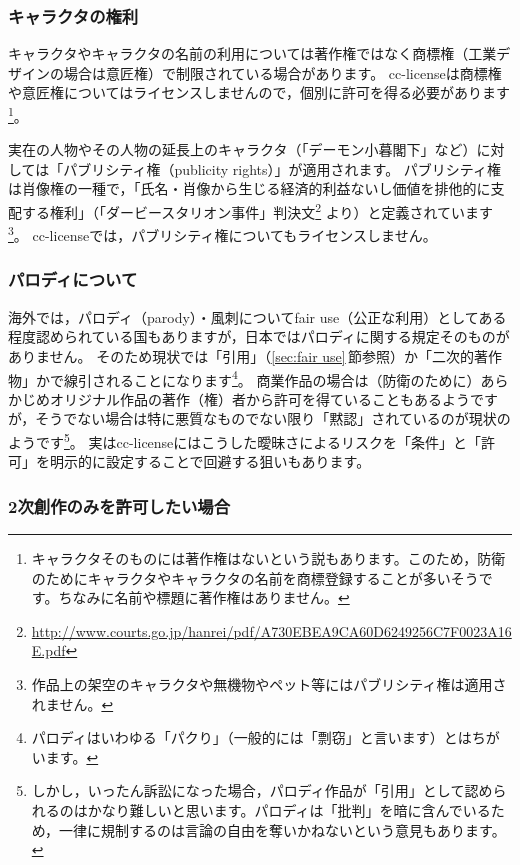 \documentclass{ltjsarticle}
\begin{document}
\subsubsection{キャラクタの権利}

キャラクタやキャラクタの名前の利用については著作権ではなく商標権（工業デザインの場合は意匠権）で制限されている場合があります。
cc-licenseは商標権や意匠権についてはライセンスしませんので，個別に許可を得る必要があります\footnote{キャラクタそのものには著作権はないという説もあります。このため，防衛のためにキャラクタやキャラクタの名前を商標登録することが多いそうです。ちなみに名前や標題に著作権はありません。}。

実在の人物やその人物の延長上のキャラクタ（「デーモン小暮閣下」など）に対しては「パブリシティ権（publicity rights）」が適用されます。
パブリシティ権は肖像権の一種で，「氏名・肖像から生じる経済的利益ないし価値を排他的に支配する権利」（「ダービースタリオン事件」判決文\footnote{\url{http://www.courts.go.jp/hanrei/pdf/A730EBEA9CA60D6249256C7F0023A16E.pdf}} より）と定義されています\footnote{作品上の架空のキャラクタや無機物やペット等にはパブリシティ権は適用されません。}。
cc-licenseでは，パブリシティ権についてもライセンスしません。

\subsubsection{パロディについて}

海外では，パロディ（parody）・風刺についてfair use（公正な利用）としてある程度認められている国もありますが，日本ではパロディに関する規定そのものがありません。
そのため現状では「引用」（\ref{sec:fair use}\,節参照）か「二次的著作物」かで線引されることになります\footnote{パロディはいわゆる「パクり」（一般的には「剽窃」と言います）とはちがいます。}。
商業作品の場合は（防衛のために）あらかじめオリジナル作品の著作（権）者から許可を得ていることもあるようですが，そうでない場合は特に悪質なものでない限り「黙認」されているのが現状のようです\footnote{しかし，いったん訴訟になった場合，パロディ作品が「引用」として認められるのはかなり難しいと思います。パロディは「批判」を暗に含んでいるため，一律に規制するのは言論の自由を奪いかねないという意見もあります。}。
実はcc-licenseにはこうした曖昧さによるリスクを「条件」と「許可」を明示的に設定することで回避する狙いもあります。

\subsubsection{2次創作のみを許可したい場合}
\end{document}
